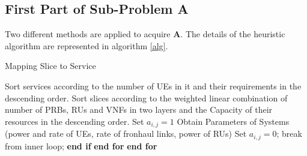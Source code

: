 \documentclass[conference]{IEEEtran}
\begin{document}
\subsection{First Part of Sub-Problem A}\label{firstsub}
Two different methods are applied to acquire $\boldsymbol{A}$.
The details of the heuristic algorithm are represented in algorithm \ref{alg}.
\begin{algorithm}
\caption{Mapping Slice to Service}\label{alg}
\begin{algorithmic}[1]
\State Sort services according to the number of UEs in it and their requirements in the descending order.
\State Sort slices according to the weighted linear combination of number of PRBs, RUs and VNFs in two layers and the Capacity of their resources in the descending order.
\State Set $a_{i,j} = 1$
\State Obtain Parameters of Systems (power and rate of UEs, rate of fronhaul links, power of RUs)
\State Set $a_{i,j} = 0$;
\Else
\State break from inner loop;
\EndIf
\State \textbf{end if}
\EndFor
\State \textbf{end for}
\EndFor
\State \textbf{end for}
\end{algorithmic}
\end{algorithm}
\end{document}
